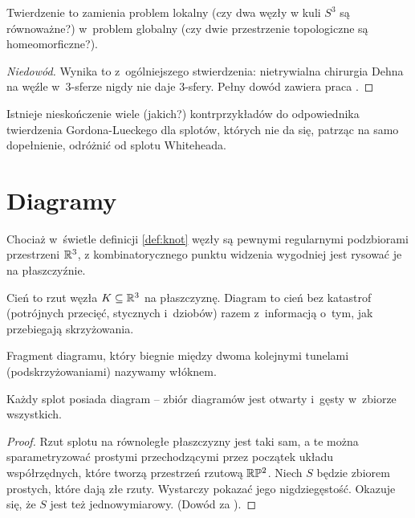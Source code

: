 Twierdzenie to zamienia problem lokalny (czy dwa węzły w kuli $S^3$ są równoważne?) w~problem globalny (czy dwie przestrzenie topologiczne są homeomorficzne?).

\begin{proof}[Niedowód]
    Wynika to z~ogólniejszego stwierdzenia:
    nietrywialna chirurgia Dehna na węźle w~3-sferze nigdy nie daje 3-sfery.
    Pełny dowód zawiera praca \cite{gordon89}.
\end{proof}

Istnieje nieskończenie wiele (jakich?) kontrprzykładów do odpowiednika twierdzenia Gordona-Lueckego dla splotów,
których nie da się, patrząc na samo dopełnienie, odróżnić od splotu Whiteheada.

\section{Diagramy}
Chociaż w~świetle definicji \ref{def:knot} węzły są pewnymi regularnymi podzbiorami przestrzeni $\mathbb R^3$,
z kombinatorycznego punktu widzenia wygodniej jest rysować je na  płaszczyźnie.

\begin{definition} [diagram] \label{def_diagrams}
    Cień to rzut węzła $K \subseteq \mathbb R^3$ na płaszczyznę.
    Diagram to cień bez katastrof
    (potrójnych przecięć, stycznych i~dziobów)
    razem z~informacją o~tym, jak przebiegają skrzyżowania.
\end{definition}

\begin{definition} [włókno]
    Fragment diagramu, który biegnie między dwoma kolejnymi tunelami (podskrzyżowaniami) nazywamy włóknem.
\end{definition}

\begin{proposition}
    Każdy splot posiada diagram -- zbiór diagramów jest otwarty i~gęsty w~zbiorze wszystkich.
\end{proposition}

\begin{proof}
    Rzut splotu na równoległe płaszczyzny jest taki sam,
    a te można sparametryzować prostymi przechodzącymi przez początek układu współrzędnych,
    które tworzą przestrzeń rzutową $\mathbb R \mathbb P^2$.
    Niech $S$ będzie zbiorem prostych, które dają złe rzuty.
    Wystarczy pokazać jego nigdziegęstość.
    Okazuje się, że $S$ jest też jednowymiarowy.
    (Dowód za \cite{crowell63}).
\end{proof}

